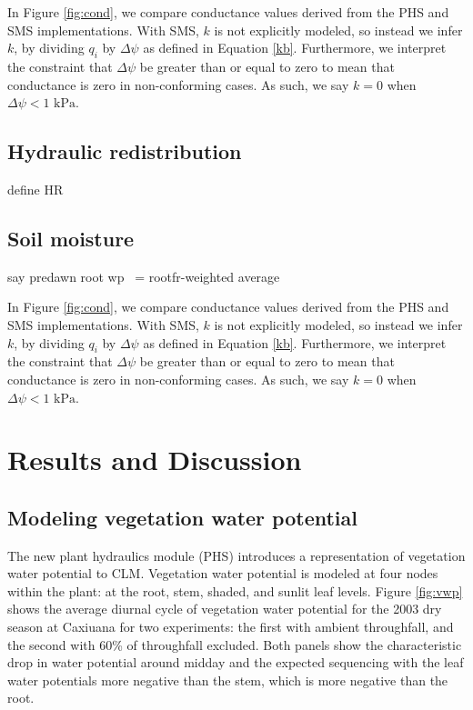 \documentclass[draft,linenumbers]{agujournal}
\begin{document}
    In Figure \ref{fig:cond}, we compare conductance values derived from the PHS and SMS implementations.
    With SMS, $k$ is not explicitly modeled, so instead we infer $k$, 
    by dividing $q_i$ by $\Delta\psi$ as defined in Equation \ref{kb}.
    Furthermore, we interpret the constraint that $\Delta\psi$ be greater than or equal to zero to mean 
    that conductance is zero in non-conforming cases. As such, we say $k=0$ when $\Delta\psi<\text{1 kPa}$.

\subsection{Hydraulic redistribution}
define HR

\subsection{Soil moisture}
say predawn root wp ~= rootfr-weighted average


    In Figure \ref{fig:cond}, we compare conductance values derived from the PHS and SMS implementations.
    With SMS, $k$ is not explicitly modeled, so instead we infer $k$, 
    by dividing $q_i$ by $\Delta\psi$ as defined in Equation \ref{kb}.
    Furthermore, we interpret the constraint that $\Delta\psi$ be greater than or equal to zero to mean 
    that conductance is zero in non-conforming cases. As such, we say $k=0$ when $\Delta\psi<\text{1 kPa}$.
    

    
\section{Results and Discussion}
\subsection{Modeling vegetation water potential}

The new plant hydraulics module (PHS) introduces a representation of vegetation water potential to CLM.
Vegetation water potential is modeled at four nodes within the plant: at the root, stem, shaded, and sunlit leaf levels.
Figure \ref{fig:vwp} shows the average diurnal cycle of vegetation water potential for the 2003 dry season at Caxiuana for two experiments:
the first with ambient throughfall, and the second with 60\% of throughfall excluded. 
Both panels show the characteristic drop in water potential around midday and the expected sequencing with 
the leaf water potentials more negative than the stem, which is more negative than the root.
\end{document}
